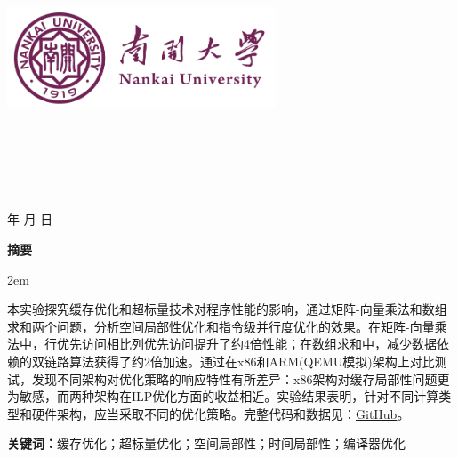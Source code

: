\documentclass[a4paper,colorlinks=true,linkcolor=blue,urlcolor=blue,citecolor=green,bookmarks=true]{article}
\newenvironment{cnabstract}{
    \par\small
    \noindent\mbox{}\par\vspace{-\baselineskip}
    \par\songti\parindent 2em
    }
    {\par\vspace{1em}}
\begin{document}
\renewcommand{\contentsname}{目录}
\renewcommand{\appendixname}{附录}
\renewcommand{\appendixpagename}{附录}
\renewcommand{\refname}{参考文献} 
\renewcommand{\figurename}{图}
\renewcommand{\tablename}{表}
\renewcommand{\abstractname}{摘要}
\renewcommand{\today}{\number\year 年 \number\month 月 \number\day 日}

\renewcommand {\thefigure}{\thesection{}.\arabic{figure}}%
\renewcommand{\figurename}{图}
\renewcommand{\contentsname}{目录}  

\begin{titlepage}
    \begin{center}
    \includegraphics[width=0.6\textwidth]{NKU.png}\\[1cm]
    \vspace{20mm}
		\textbf{\huge\textbf{}}\\[0.5cm]
		\textbf{\huge{}}\\[2.3cm]
		\textbf{\Huge\textbf{}}

		\vspace{\fill}
    
    \centering
    \textsc{\LARGE {}}\\[0.5cm]
    \textsc{\LARGE {}}\\[0.5cm]
    \textsc{\LARGE {}}\\[0.5cm]
    
    \vfill
    {\Large \today}
    \end{center}
\end{titlepage}

\clearpage
{}
\begin{center}{\songti\bfseries{摘\quad 要}}\end{center}\par\vspace{0.5em}
\begin{cnabstract}
本实验探究缓存优化和超标量技术对程序性能的影响，通过矩阵-向量乘法和数组求和两个问题，分析空间局部性优化和指令级并行度优化的效果。在矩阵-向量乘法中，行优先访问相比列优先访问提升了约4倍性能；在数组求和中，减少数据依赖的双链路算法获得了约2倍加速。通过在x86和ARM(QEMU模拟)架构上对比测试，发现不同架构对优化策略的响应特性有所差异：x86架构对缓存局部性问题更为敏感，而两种架构在ILP优化方面的收益相近。实验结果表明，针对不同计算类型和硬件架构，应当采取不同的优化策略。完整代码和数据见：\href{https://github.com/aokimi0/parallel-programming}{GitHub}。

\vspace{1em}
\noindent\textbf{关键词：}缓存优化；超标量优化；空间局部性；时间局部性；编译器优化
\end{cnabstract}
\end{document}
